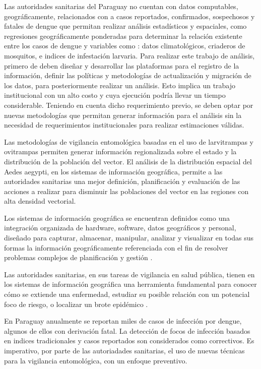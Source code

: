 Las autoridades sanitarias del Paraguay no cuentan con datos computables, geográficamente,
relacionados con a casos reportados, confirmados, sospechosos y fatales de dengue que permitan
realizar análisis estadísticos y espaciales, como regresiones geográficamente ponderadas para
determinar la relación existente entre los casos de dengue y variables como : datos
climatológicos, criaderos de mosquitos, e indices de infestación larvaria. Para realizar este
trabajo de análisis, primero de deben diseñar y desarrollar las plataformas para el registro de la
información, definir las políticas y metodologías de actualización y migración de los
datos, para posteriormente realizar un análisis. Esto implica un trabajo institucional con un
alto costo y cuya ejecución podría llevar un tiempo considerable. Teniendo en cuenta dicho
requerimiento previo, se deben optar por nuevas metodologías que permitan generar información para
el análisis sin la necesidad de requerimientos institucionales para realizar estimaciones válidas.

Las metodologías de vigilancia entomológica basadas en el uso de larvitrampas y ovitrampas
permiten generar información regionalizada sobre el estado y la distribución de la población del
vector. El análisis de la distribución espacial del Aedes aegypti, en los sistemas de información
geográfica, permite a las autoridades sanitarias una mejor definición, planificación y evaluación
de las acciones a realizar para disminuir las poblaciones del vector en las regiones con alta
densidad vectorial.

Los sistemas de información geográfica se encuentran definidos como una integración organizada de
hardware, software, datos geográficos y personal, diseñado para capturar, almacenar, manipular,
analizar y visualizar en todas sus formas la información geográficamente referenciada con el fin
de resolver problemas complejos de planificación y gestión \citep{lopezMarcos2007}.

Las autoridades sanitarias, en sus tareas de vigilancia en salud pública, tienen en los sistemas
de información geográfica una herramienta fundamental para conocer cómo se extiende una
enfermedad, estudiar su posible relación con un potencial foco de riesgo, o localizar un brote
epidémico \cite{vgomesAegis2001}.

En Paraguay anualmente se reportan miles de casos de infección por dengue, algunos de ellos con
derivación fatal. La detección de focos de infección basados en indices tradicionales y casos
reportados son considerados como correctivos. Es imperativo, por parte de las autoriadades
sanitarias, el uso de nuevas técnicas para la vigilancia entomológica, con un enfoque preventivo.


